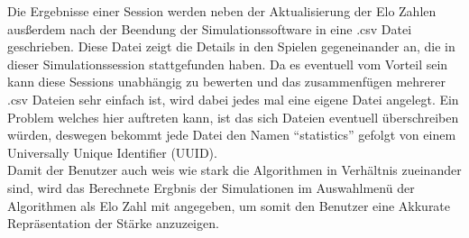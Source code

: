 \documentclass[12pt,a4paper,bibliography=totocnumbered,listof=totocnumbered]{article}
\begin{document}
Die Ergebnisse einer Session werden neben der Aktualisierung der Elo Zahlen ausßerdem nach der Beendung der Simulationssoftware in eine .csv Datei 
geschrieben. Diese Datei zeigt die Details in den Spielen gegeneinander an, die in dieser Simulationssession stattgefunden haben.
Da es eventuell vom Vorteil sein kann diese Sessions unabhängig zu bewerten und das zusammenfügen mehrerer .csv Dateien sehr einfach ist, 
wird dabei jedes mal eine eigene Datei angelegt. Ein Problem welches hier auftreten kann, ist das sich Dateien eventuell überschreiben würden, deswegen 
bekommt jede Datei den Namen ``statistics'' gefolgt von einem Universally Unique Identifier (UUID).
\\
Damit der Benutzer auch weis wie stark die Algorithmen in Verhältnis zueinander sind, wird das Berechnete Ergbnis der Simulationen im Auswahlmenü der 
Algorithmen als Elo Zahl mit angegeben, um somit den Benutzer eine Akkurate Repräsentation der Stärke anzuzeigen.
\end{document}
